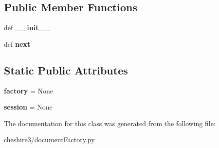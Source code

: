 \subsection*{Public Member Functions}
\begin{DoxyCompactItemize}
\item 
\hypertarget{classcheshire3_1_1document_factory_1_1_document_factory_iter_a3a26d3d5b65324f79ffde6eece388975}{def {\bfseries \-\_\-\-\_\-init\-\_\-\-\_\-}}\label{classcheshire3_1_1document_factory_1_1_document_factory_iter_a3a26d3d5b65324f79ffde6eece388975}

\item 
\hypertarget{classcheshire3_1_1document_factory_1_1_document_factory_iter_accff7409fab320c32150295107775aaa}{def {\bfseries next}}\label{classcheshire3_1_1document_factory_1_1_document_factory_iter_accff7409fab320c32150295107775aaa}

\end{DoxyCompactItemize}
\subsection*{Static Public Attributes}
\begin{DoxyCompactItemize}
\item 
\hypertarget{classcheshire3_1_1document_factory_1_1_document_factory_iter_a0df9a8372bbc2042df7420fe39ec519b}{{\bfseries factory} = None}\label{classcheshire3_1_1document_factory_1_1_document_factory_iter_a0df9a8372bbc2042df7420fe39ec519b}

\item 
\hypertarget{classcheshire3_1_1document_factory_1_1_document_factory_iter_a4bdfbff9ab6130569d981e553cb6c71c}{{\bfseries session} = None}\label{classcheshire3_1_1document_factory_1_1_document_factory_iter_a4bdfbff9ab6130569d981e553cb6c71c}

\end{DoxyCompactItemize}


The documentation for this class was generated from the following file\-:\begin{DoxyCompactItemize}
\item 
cheshire3/document\-Factory.\-py\end{DoxyCompactItemize}
